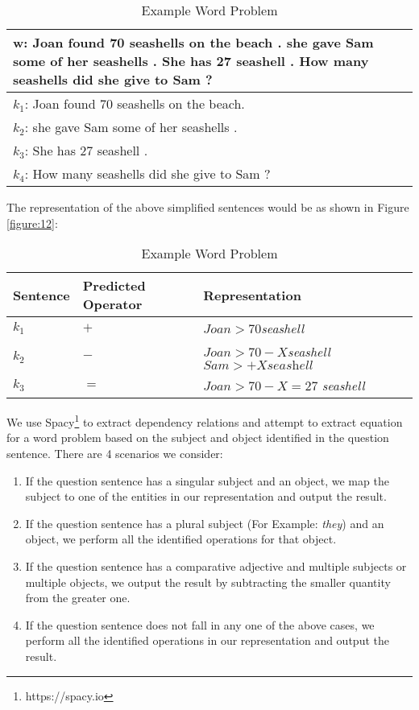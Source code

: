 \documentclass[11pt]{article}
\begin{document}
\begin{table}[h!]
\centering
\begin{tabular}{ | m{7cm} | }
\hline
 $\mathbf{w}$\textbf{: Joan found 70 seashells on the beach . she gave Sam some of her seashells . She has 27 seashell . How many seashells did she give to Sam ?}\\
\hline
$\mathit{k_{1}}$: Joan found 70 seashells on the beach.\\
\hline
$\mathit{k_{2}}$: she gave Sam some of her seashells .\\
\hline
$\mathit{k_{3}}$: She has 27 seashell .\\
\hline
$\mathit{k_{4}}$: How many seashells did she give to Sam ?\\
\hline
\end{tabular}
\caption{Example Word Problem}
\label{figure:11}
\end{table}

The representation of the above simplified sentences would be as shown in Figure \ref{figure:12}:
\begin{table}[h!]
\centering
\begin{tabular}{ |p{1.3cm}|p{1.7cm}|p{3.7cm}| }
\hline
\textbf{Sentence} & \textbf{Predicted Operator} & \textbf{Representation} \\ \hline
$\mathit{k_{1}}$ & $\mathit{+}$ & $\mathit{Joan > 70}$\textit{seashell} \\ \hline
$\mathit{k_{2}}$ & $\mathit{-}$ & $\mathit{Joan> 70 - X}$\textit{seashell} $\mathit{Sam > +X}\textit{seashell}$ \\ \hline
$\mathit{k_{3}}$ & $\mathit{=}$ & $\mathit{Joan > 70 - X = 27}$ \textit{seashell}\\ \hline
\end{tabular}
\caption{Example Word Problem}
\label{figure:11}
\end{table}



We use Spacy\footnote{https://spacy.io} to extract dependency relations and attempt to extract equation for a word problem based on the subject and object identified in the question sentence. There are 4 scenarios we consider:
\begin{enumerate}[topsep=0pt,itemsep=-1ex,partopsep=1ex,parsep=1ex]
\item If the question sentence has a singular subject and an object, we map the subject to one of the entities in our representation and output the result.
\item If the question sentence has a plural subject (For Example: \textit{they}) and an object, we perform all the identified operations for that object.
\item If the question sentence has a comparative adjective and multiple subjects or multiple objects, we output the result by subtracting the smaller quantity from the greater one.
\item If the question sentence does not fall in any one of the above cases, we perform all the identified operations in our representation and output the result.
\end{enumerate}
\end{document}

